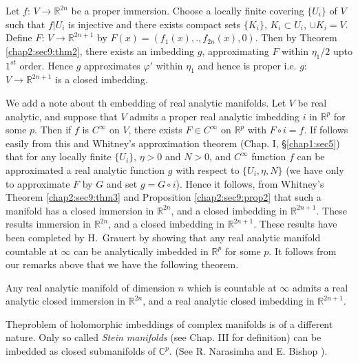 Let $f$: $V \to \mathbb{R}^{2n}$ be a proper immersion. Choose a
locally finite covering $\{ U_i\}$ of $V$ such that $f| U_i$  is
injective and there exists compact sets $\{ K_i \}$, $K_i \subset
U_i$, $\cup K_i =V$. Define $F$: $V \to \mathbb{R}^{2n+1}$ by
$F(x)=(f_1(x),.,f_{2n}(x),0)$. Then by Theorem \ref{chap2:sec9:thm2}, there exists an
imbedding $g$, approximating $F$ within $\eta_1/2$ upto $1^{st}$
order. Hence $g$ approximates $\varphi'$ within $\eta_1$ and hence is
proper i.e. $g$: $V \to \mathbb{R}^{2n+1}$ is a closed imbedding. 

We add a note about th embedding of real analytic manifolds. Let $V$
be real analytic, and suppose that $V$ admits a proper real analytic
imbedding $i$ in $\mathbb{R}^p$ for some $p$. Then if $f$ is $C^
\infty$ on $V$, there exists $F \in C^ \infty$ on $\mathbb{R}^p$ with
$F \circ i = f$. If follows easily from this and Whitney's approximation
theorem (Chap. I, \S \ref{chap1:sec5}) that for any locally finite $\{ U_i \}$, $\eta
>0$ and $N>0$, and $C^ \infty$ function $f$ can be approximated a real
analytic function $g$ with respect to $\{ U_i, \eta, N \}$ (we have
only to approximate $F$ by $G$ and set $g = G \circ i$). Hence it follows,
from Whitney's Theorem \ref{chap2:sec9:thm3} and
Proposition \ref{chap2:sec9:prop2} that such a manifold has a
closed immersion in $\mathbb{R}^{2n}$, and a closed imbedding in
$\mathbb{R}^{2n+1}$. These results immersion in $\mathbb{R}^{2n}$, and
a closed imbedding in $\mathbb{R}^{2n+1}$. These results have been
completed by H.~Grauert \cite{13} by showing that any real analytic manifold
countable at $\infty$ can be analytically imbedded in $\mathbb{R}^p$
for some $p$. It follows from our remarks above that we have the
following theorem. 

\begin{theorem*}
  Any real analytic manifold of dimension $n$ which is countable at
  $\infty$ admits a real analytic closed immersion in $\mathbb{R}^{2n}$, and a
  real analytic closed imbedding in $\mathbb{R}^{2n+1}$. 
\end{theorem*}

The\pageoriginale problem of holomorphic imbeddings of complex manifolds is of a
different nature. Only so called  \textit{ Stein manifolds} (see
Chap. III for definition) can be imbedded as closed submanifolds of
$\mathbb{C}^p$. (See R. Narasimha \cite{31} and E. Bishop \cite{3}). 

